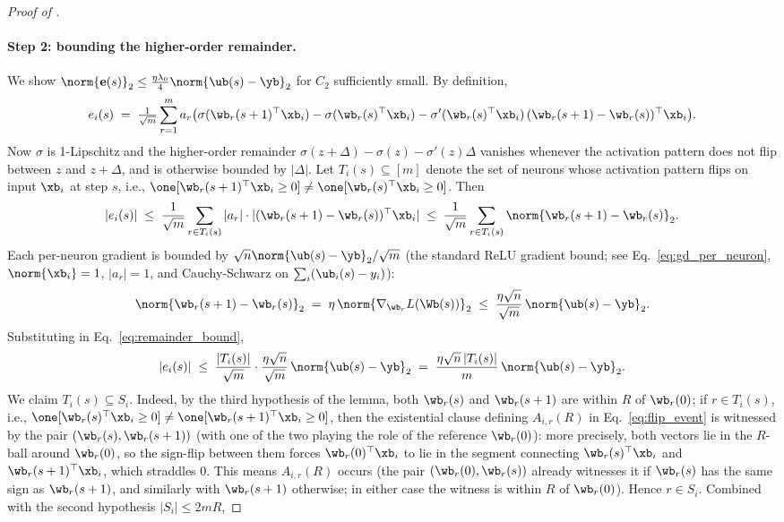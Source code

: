 \begin{proof}[Proof of ]
\paragraph{Step 2: bounding the higher-order remainder.}
We show $\norm{\mathbf e(s)}_2 \le \tfrac{\eta \lambda_0}{4} \norm{\ub(s) - \yb}_2$ for $C_2$ sufficiently small. By definition,
\begin{align*}
e_i(s)
\;=\; \tfrac{1}{\sqrt m} \sum_{r=1}^m a_r \big( \sigma(\wb_r(s+1)^\top \xb_i) - \sigma(\wb_r(s)^\top \xb_i) - \sigma'(\wb_r(s)^\top \xb_i) \, (\wb_r(s+1) - \wb_r(s))^\top \xb_i \big).
\end{align*}
Now $\sigma$ is 1-Lipschitz and the higher-order remainder $\sigma(z + \Delta) - \sigma(z) - \sigma'(z) \Delta$ vanishes whenever the activation pattern does not flip between $z$ and $z + \Delta$, and is otherwise bounded by $|\Delta|$. Let $T_i(s) \subseteq [m]$ denote the set of neurons whose activation pattern flips on input $\xb_i$ at step $s$, i.e., $\one[\wb_r(s+1)^\top \xb_i \ge 0] \ne \one[\wb_r(s)^\top \xb_i \ge 0]$. Then
\begin{align}\label{eq:remainder_bound}
|e_i(s)|
\;\le\; \frac{1}{\sqrt m} \sum_{r \in T_i(s)} |a_r| \cdot |(\wb_r(s+1) - \wb_r(s))^\top \xb_i|
\;\le\; \frac{1}{\sqrt m} \sum_{r \in T_i(s)} \norm{\wb_r(s+1) - \wb_r(s)}_2.
\end{align}
Each per-neuron gradient is bounded by $\sqrt n \norm{\ub(s) - \yb}_2 / \sqrt m$ (the standard ReLU gradient bound; see Eq.~\eqref{eq:gd_per_neuron}, $\norm{\xb_i}=1$, $|a_r|=1$, and Cauchy-Schwarz on $\sum_i (\ub_i(s) - y_i)$):
\begin{align}\label{eq:per_neuron_grad_norm}
\norm{\wb_r(s+1) - \wb_r(s)}_2
\;=\; \eta \, \norm{\nabla_{\wb_r} L(\Wb(s))}_2
\;\le\; \frac{\eta \sqrt n}{\sqrt m} \, \norm{\ub(s) - \yb}_2.
\end{align}
Substituting in Eq.~\eqref{eq:remainder_bound},
\begin{align}\label{eq:remainder_intermediate}
|e_i(s)| \;\le\; \frac{|T_i(s)|}{\sqrt m} \cdot \frac{\eta \sqrt n}{\sqrt m} \, \norm{\ub(s) - \yb}_2
\;=\; \frac{\eta \sqrt n \, |T_i(s)|}{m} \, \norm{\ub(s) - \yb}_2.
\end{align}
We claim $T_i(s) \subseteq S_i$. Indeed, by the third hypothesis of the lemma, both $\wb_r(s)$ and $\wb_r(s+1)$ are within $R$ of $\wb_r(0)$; if $r \in T_i(s)$, i.e., $\one[\wb_r(s)^\top \xb_i \ge 0] \ne \one[\wb_r(s+1)^\top \xb_i \ge 0]$, then the existential clause defining $A_{i,r}(R)$ in Eq.~\eqref{eq:flip_event} is witnessed by the pair $(\wb_r(s), \wb_r(s+1))$ (with one of the two playing the role of the reference $\wb_r(0)$): more precisely, both vectors lie in the $R$-ball around $\wb_r(0)$, so the sign-flip between them forces $\wb_r(0)^\top \xb_i$ to lie in the segment connecting $\wb_r(s)^\top \xb_i$ and $\wb_r(s+1)^\top \xb_i$, which straddles 0. This means $A_{i,r}(R)$ occurs (the pair $(\wb_r(0), \wb_r(s))$ already witnesses it if $\wb_r(s)$ has the same sign as $\wb_r(s+1)$, and similarly with $\wb_r(s+1)$ otherwise; in either case the witness is within $R$ of $\wb_r(0)$). Hence $r \in S_i$. Combined with the second hypothesis $|S_i| \le 2mR$,

\end{proof}
